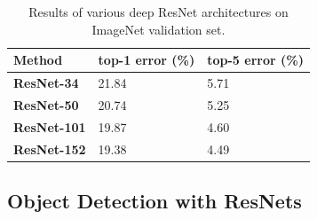 \begin{table}[]
\centering
\caption{Results of various deep ResNet architectures on ImageNet validation set.}
\label{tab:deepresimagenet}
\begin{tabular}{|l|l|l|}
\hline
\textbf{Method}     & \textbf{top-1 error (\%)} & \textbf{top-5 error (\%)} \\ \hline
\textbf{ResNet-34}  & 21.84            & 5.71             \\ \hline
\textbf{ResNet-50}  & 20.74            & 5.25             \\ \hline
\textbf{ResNet-101} & 19.87            & 4.60             \\ \hline
\textbf{ResNet-152} & 19.38            & 4.49             \\ \hline
\end{tabular}
\end{table}

\subsection{Object Detection with ResNets}

